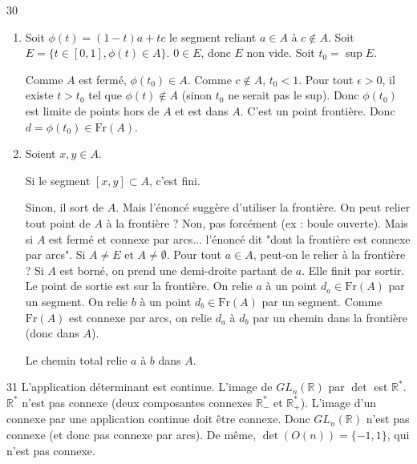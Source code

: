 \begin{correction}{30}
\begin{enumerate}
    \item Soit $\phi(t) = (1-t)a + tc$ le segment reliant $a \in A$ à $c \notin A$.
    Soit $E = \{ t \in [0,1], \phi(t) \in A \}$. $0 \in E$, donc $E$ non vide.
    Soit $t_{0} = \sup E$.

    Comme $A$ est fermé, $\phi(t_{0}) \in A$.
    Comme $c \notin A$, $t_{0} < 1$.
    Pour tout $\epsilon > 0$, il existe $t > t_{0}$ tel que $\phi(t) \notin A$ (sinon $t_{0}$ ne serait pas le sup).
    Donc $\phi(t_{0})$ est limite de points hors de $A$ et est dans $A$.
    C'est un point frontière. Donc $d = \phi(t_{0}) \in \text{Fr}(A)$.

    \item Soient $x, y \in A$.
    
    Si le segment $[x,y] \subset A$, c'est fini.
    
    Sinon, il sort de $A$. Mais l'énoncé suggère d'utiliser la frontière.
    On peut relier tout point de $A$ à la frontière ? Non, pas forcément (ex : boule ouverte).
    Mais si $A$ est fermé et connexe par arcs... l'énoncé dit "dont la frontière est connexe par arcs".
    Si $A \neq E$ et $A \neq \emptyset$.
    Pour tout $a \in A$, peut-on le relier à la frontière ?
    Si $A$ est borné, on prend une demi-droite partant de $a$. Elle finit par sortir. Le point de sortie est sur la frontière.
    On relie $a$ à un point $d_{a} \in \text{Fr}(A)$ par un segment.
    On relie $b$ à un point $d_{b} \in \text{Fr}(A)$ par un segment.
    Comme $\text{Fr}(A)$ est connexe par arcs, on relie $d_{a}$ à $d_{b}$ par un chemin dans la frontière (donc dans $A$).

    Le chemin total relie $a$ à $b$ dans $A$.
\end{enumerate}
\end{correction}

\begin{correction}{31}
L'application déterminant est continue.
L'image de $GL_{n}(\mathbb{R})$ par $\det$ est $\mathbb{R}^{*}$.
$\mathbb{R}^{*}$ n'est pas connexe (deux composantes connexes $\mathbb{R}_{-}^{*}$ et $\mathbb{R}_{+}^{*}$).
L'image d'un connexe par une application continue doit être connexe.
Donc $GL_{n}(\mathbb{R})$ n'est pas connexe (et donc pas connexe par arcs).
De même, $\det(O(n)) = \{-1, 1\}$, qui n'est pas connexe.
\end{correction}
